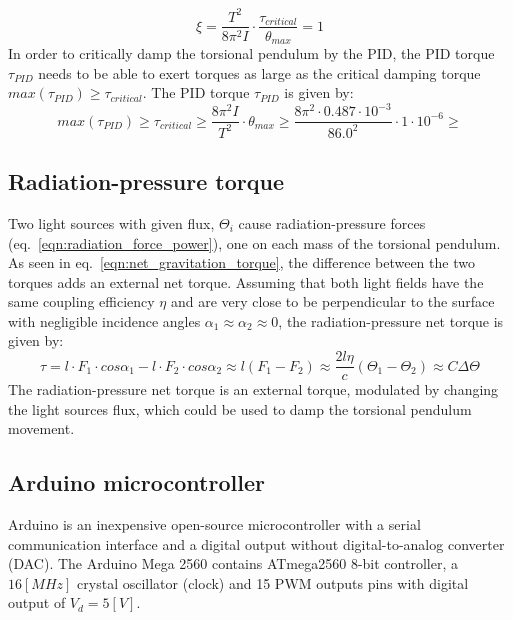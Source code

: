 \documentclass[\main/master.tex]{subfiles}
\begin{document}
\begin{equation}
\xi = \frac{T^2}{ 8 \pi^2 I }\cdot\frac{ \tau_{critical}}{\theta_{max}} = 1 
\label{eqn:damping_ratio_pid}
\end{equation}
In order to critically damp the torsional pendulum by the PID, the PID torque $\tau_{PID}$ needs to be able to exert torques as large as the critical damping torque $max(\tau_{PID}) \geq  \tau_{critical}$. The PID torque $\tau_{PID}$ is given by:
\begin{equation}
max(\tau_{PID}) \geq  \tau_{critical} \geq \frac{ 8 \pi^2 I }{T^2}\cdot\theta_{max} \geq \frac{ 8 \pi^2 \cdot 0.487\cdot10^{-3} }{86.0^2}\cdot 1\cdot10^{-6}\geq
\label{eqn:damping_ratio_pid}
\end{equation}
\par\noindent




\subsection{Radiation-pressure torque}
Two light sources with given flux, $\Theta_i$ cause radiation-pressure forces (eq.~\ref{eqn:radiation_force_power}), one on each mass of the torsional pendulum. As seen in eq.~\ref{eqn:net_gravitation_torque}, the difference between the two torques adds an external net torque. Assuming that both light fields have the same coupling efficiency $\eta$ and are very close to be perpendicular to the surface with negligible incidence angles $\alpha_1\approx\alpha_2\approx 0$, the radiation-pressure net torque is given by:  
\begin{equation}
\tau = l\cdot F_1 \cdot cos\alpha_1 - l\cdot F_2 \cdot cos\alpha_2\approx l(F_1 - F_2) \approx \frac{2l\eta}{{c}} (\Theta_1 -\Theta_2)\approx C\Delta \Theta \label{eqn:radiation torque}
\end{equation}
The radiation-pressure net torque is an external torque, modulated by changing the light sources flux, which could be used to damp the torsional pendulum movement.

\subsection{Arduino microcontroller}
Arduino is an inexpensive open-source microcontroller with a serial communication interface and a digital output without digital-to-analog converter (DAC). The Arduino Mega 2560 contains ATmega2560 8-bit controller, a $16 [MHz]$ crystal oscillator (clock) and 15 PWM outputs pins with digital output of $V_d = 5[V]$.
\end{document}
